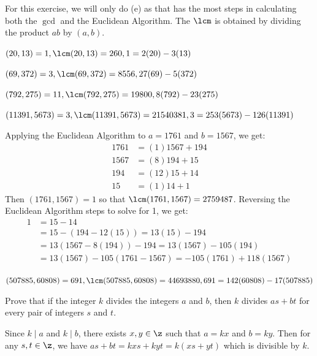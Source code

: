 \begin{sol}
    For this exercise, we will only do (e) as that has the most steps in calculating both the $\gcd$ and the Euclidean Algorithm. The $\lcm$ is obtained by dividing the product $ab$ by $(a, b)$.
    \begin{subproblems}
        \item$(20, 13) = 1, \lcm(20, 13) = 260, 1 = 2(20) - 3(13)$
        \item $(69, 372) = 3,\lcm(69, 372) = 8556, 27(69) -5(372)$
        \item $(792, 275) = 11, \lcm(792, 275) = 19800, 8(792) - 23(275)$
        \item $(11391, 5673) = 3 ,\lcm(11391, 5673) = 21540381, 3 = 253(5673) - 126(11391)$
        \item Applying the Euclidean Algorithm to $a = 1761$ and $b = 1567$, we get:
        \begin{align*}
            1761 & = (1)1567 + 194 \\
            1567 & = (8)194 + 15 \\
            194 & = (12)15 + 14 \\
            15 & = (1)14 + 1
        \end{align*}
        Then $(1761, 1567) = 1$ so that $\lcm(1761, 1567) = 2759487$. Reversing the Euclidean Algorithm steps to solve for 1, we get:
        \begin{align*}
            1 & = 15 - 14 \\
            & = 15 - (194 - 12(15)) = 13(15) - 194 \\
            & = 13(1567 - 8(194)) - 194 = 13(1567) - 105(194) \\
            & = 13(1567) - 105(1761 - 1567) = -105(1761) + 118(1567)
        \end{align*}
        \item $(507885, 60808) = 691, \lcm(507885, 60808) = 44693880, 691 = 142(60808) - 17(507885)$ \qh
    \end{subproblems}
\end{sol}

\begin{exercise}\label{ex0.2.2}
    Prove that if the integer $k$ divides the integers $a$ and $b$, then $k$ divides $as + bt$ for every pair of integers $s$ and $t$. 
\end{exercise}

\begin{sol}
    Since $k \mid a$ and $k \mid b$, there exists $x, y \in \z$ such that $a = kx$ and $b = ky$. Then for any $s, t \in \z$, we have $as + bt = kxs + kyt = k(xs + yt)$ which is divisible by $k$.
\end{sol}

